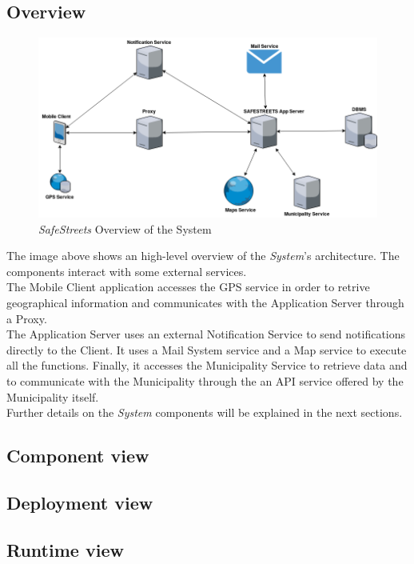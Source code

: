 \documentclass{article}
\begin{document}
	\subsection{Overview}
		\begin{figure}[H]
			\centering
			\includegraphics[scale=0.5]{Images/Overview.png}
			\caption{{\it SafeStreets} Overview of the System}
		\end{figure}
	The image above shows an high-level overview of the {\it System}'s architecture.
	The components interact with some external services. \\
	The Mobile Client application accesses the GPS service in order to retrive geographical information and communicates with the Application Server through a Proxy. \\ The Application Server uses an external Notification Service to send notifications directly to the Client. It uses a Mail System service and a Map service to execute all the functions. Finally, it accesses the Municipality Service to retrieve data and to communicate with the Municipality through the an API service offered by the Municipality itself.\\ 
	Further details on the {\it System} components will be explained in the next sections. 		
	
		
	\subsection{Component view}
	
		
	\subsection{Deployment view}
	
		
	\subsection{Runtime view}
	
\end{document}

